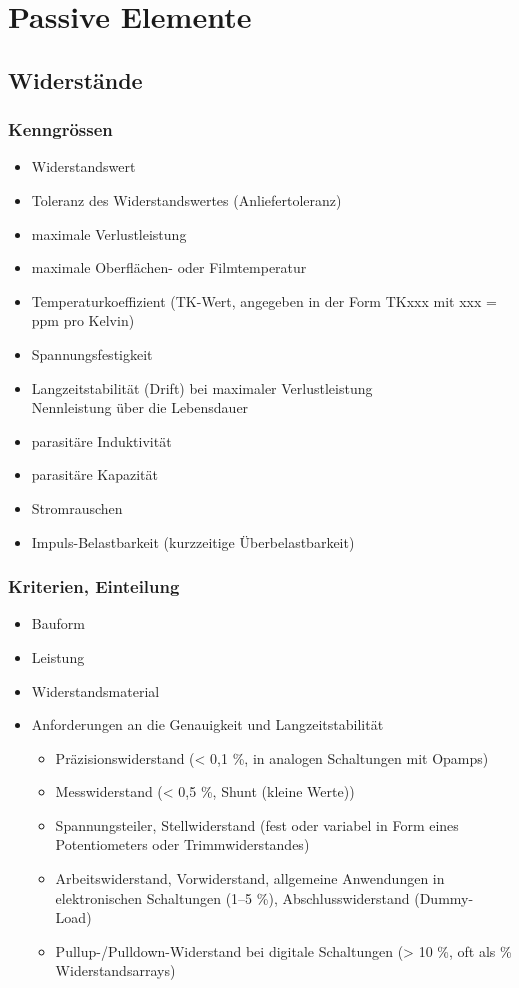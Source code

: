 \section{Passive Elemente}

\subsection{Widerstände}
\subsubsection{Kenngrössen}
\begin{itemize}
  \item Widerstandswert
  \item Toleranz des Widerstandswertes (Anliefertoleranz)
  \item maximale Verlustleistung
  \item maximale Oberflächen- oder Filmtemperatur
  \item Temperaturkoeffizient (TK-Wert, angegeben in der Form TKxxx mit xxx = ppm pro Kelvin)
  \item Spannungsfestigkeit
  \item Langzeitstabilität (Drift) bei maximaler Verlustleistung\\
  Nennleistung über die Lebensdauer
  \item parasitäre Induktivität
  \item parasitäre Kapazität
  \item Stromrauschen
  \item Impuls-Belastbarkeit (kurzzeitige Überbelastbarkeit)
\end{itemize}

\subsubsection{Kriterien, Einteilung}
\begin{itemize}
  \item Bauform
  \item Leistung
  \item Widerstandsmaterial
  \item Anforderungen an die Genauigkeit und Langzeitstabilität
  \begin{itemize}
    \item Präzisionswiderstand (< 0,1 \%, in analogen Schaltungen mit Opamps)
    \item Messwiderstand (< 0,5 \%, Shunt (kleine Werte))
    \item Spannungsteiler, Stellwiderstand (fest oder variabel in Form eines
    Potentiometers oder Trimmwiderstandes)
    \item Arbeitswiderstand, Vorwiderstand, allgemeine Anwendungen in
    elektronischen Schaltungen (1–5 \%), Abschlusswiderstand (Dummy- Load)
    \item Pullup-/Pulldown-Widerstand bei digitale Schaltungen (> 10 \%, oft als
    \% Widerstandsarrays)
    \end{itemize}
\end{itemize}


